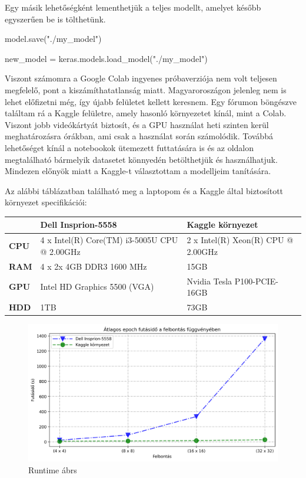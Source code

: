 Egy másik lehetőségként lementhetjük a teljes modellt, amelyet később egyszerűen be is tölthetünk.
\begin{python}
model.save("./my_model")

new_model = keras.models.load_model("./my_model")
\end{python}
Viszont számomra a Google Colab ingyenes próbaverziója nem volt teljesen megfelelő, pont a kiszámíthatatlanság miatt. Magyaroroszágon jelenleg nem is lehet előfizetni még, így újabb felületet kellett keresnem. Egy fórumon böngészve találtam rá a Kaggle felületre, amely hasonló környezetet kínál, mint a Colab. Viszont jobb videókártyát biztosít, és a GPU használat heti szinten kerül meghatározásra órákban, ami csak a használat során számolódik. Továbbá lehetőséget kínál a notebookok ütemezett futtatására is és az oldalon megtalálható bármelyik datasetet könnyedén betölthetjük és használhatjuk. Mindezen előnyök miatt a Kaggle-t választottam a modelljeim tanítására.

Az alábbi táblázatban található meg a laptopom és a Kaggle által biztosított környezet specifikációi:

\begin{tabular}{ |p{1.2cm}||p{6cm}|p{6cm}|  }
	\hline
	  & Dell Insprion-5558 & Kaggle környezet\\
	\hline
	\textbf{CPU} & 4 x Intel(R) Core(TM) i3-5005U CPU @ 2.00GHz & 2 x Intel(R) Xeon(R) CPU @ 2.00GHz\\
	\textbf{RAM} & 4 x 2x 4GB DDR3 1600 MHz & 15GB\\
	\textbf{GPU} & Intel HD Graphics 5500 (VGA) & Nvidia Tesla P100-PCIE-16GB\\
	\textbf{HDD} & 1TB & 73GB\\
	\hline
\end{tabular}

\begin{figure}[h]
\centering
\includegraphics[width=15cm]{images/runtime.png}
\caption{Runtime ábrs}
\label{fig:runtime}
\end{figure}



